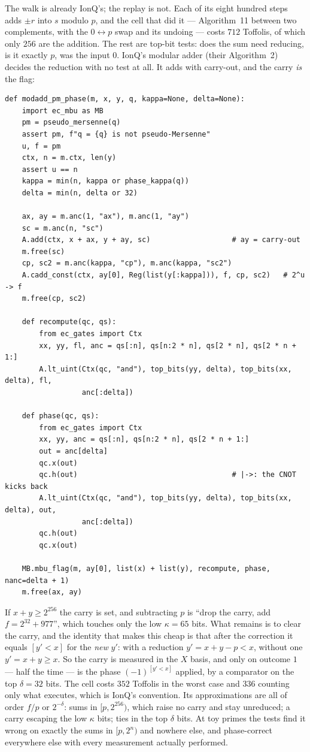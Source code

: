 \documentclass[11pt]{article}
\theoremstyle{plain}
\theoremstyle{remark}
\begin{document}
The walk is already IonQ's; the replay is not. Each of its eight hundred steps adds $\pm r$ into $s$
modulo $p$, and the cell that did it --- Algorithm~11 between two complements, with the
$0\leftrightarrow p$ swap and its undoing --- costs $712$ Toffolis, of which only $256$ are
the addition. The rest are top-bit tests: does the sum need reducing, is it exactly $p$, was the
input $0$. IonQ's modular adder (their Algorithm~2) decides the reduction with no test at all. It
adds with carry-out, and the carry \emph{is} the flag:
\begin{lstlisting}
def modadd_pm_phase(m, x, y, q, kappa=None, delta=None):
    import ec_mbu as MB
    pm = pseudo_mersenne(q)
    assert pm, f"q = {q} is not pseudo-Mersenne"
    u, f = pm
    ctx, n = m.ctx, len(y)
    assert u == n
    kappa = min(n, kappa or phase_kappa(q))
    delta = min(n, delta or 32)

    ax, ay = m.anc(1, "ax"), m.anc(1, "ay")
    sc = m.anc(n, "sc")
    A.add(ctx, x + ax, y + ay, sc)                   # ay = carry-out
    m.free(sc)
    cp, sc2 = m.anc(kappa, "cp"), m.anc(kappa, "sc2")
    A.cadd_const(ctx, ay[0], Reg(list(y[:kappa])), f, cp, sc2)   # 2^u -> f
    m.free(cp, sc2)

    def recompute(qc, qs):
        from ec_gates import Ctx
        xx, yy, fl, anc = qs[:n], qs[n:2 * n], qs[2 * n], qs[2 * n + 1:]
        A.lt_uint(Ctx(qc, "and"), top_bits(yy, delta), top_bits(xx, delta), fl,
                  anc[:delta])

    def phase(qc, qs):
        from ec_gates import Ctx
        xx, yy, anc = qs[:n], qs[n:2 * n], qs[2 * n + 1:]
        out = anc[delta]
        qc.x(out)
        qc.h(out)                                    # |->: the CNOT kicks back
        A.lt_uint(Ctx(qc, "and"), top_bits(yy, delta), top_bits(xx, delta), out,
                  anc[:delta])
        qc.h(out)
        qc.x(out)

    MB.mbu_flag(m, ay[0], list(x) + list(y), recompute, phase, nanc=delta + 1)
    m.free(ax, ay)
\end{lstlisting}
\noindent If $x+y\ge2^{256}$ the carry is set, and subtracting $p$ is ``drop the carry, add
$f=2^{32}+977$'', which touches only the low $\kappa=65$ bits. What remains is to clear the
carry, and the identity that makes this cheap is that after the correction it equals $[y'<x]$ for
the \emph{new} $y'$: with a reduction $y'=x+y-p<x$, without one $y'=x+y\ge x$. So the carry is
measured in the $X$ basis, and only on outcome $1$ --- half the time --- is the phase $(-1)^{[y'<x]}$
applied, by a comparator on the top $\delta=32$ bits. The cell costs $352$
Toffolis in the worst case and $336$ counting only what executes, which is IonQ's
convention. Its approximations are all of order $f/p$ or $2^{-\delta}$: sums in $[p,2^{256})$,
which raise no carry and stay unreduced; a carry escaping the low $\kappa$ bits; ties in the top
$\delta$ bits. At toy primes the tests find it wrong on exactly the sums in $[p,2^n)$ and nowhere
else, and phase-correct everywhere else with every measurement actually performed.
\end{document}

